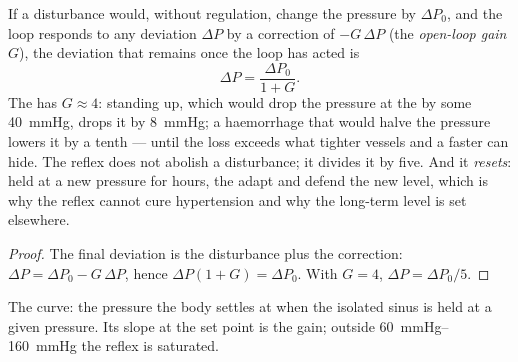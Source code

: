 \begin{theorem}\label{thm:b2:blood-pressure:gain}
If a disturbance would, without regulation, change the pressure by
$\Delta P_0$, and the loop responds to any deviation $\Delta P$ by a
correction of $-G\,\Delta P$ (the \emph{open-loop gain} $G$), the
deviation that remains once the loop has acted is
\[
\Delta P = \frac{\Delta P_0}{1 + G}.
\]
The  has $G \approx 4$: standing up, which would drop the
pressure at the  by some \qty{40}{mmHg}, drops it by
\qty{8}{mmHg}; a haemorrhage that would halve the pressure lowers it
by a tenth --- until the loss exceeds what tighter vessels and a
faster  can hide. The reflex does not abolish a disturbance;
it divides it by five. And it \emph{resets}: held at a new pressure
for hours, the  adapt and defend the new level, which
is why the reflex cannot cure hypertension and why the long-term
level is set elsewhere.
\end{theorem}
\begin{proof}
The final deviation is the disturbance plus the correction:
$\Delta P = \Delta P_0 - G\,\Delta P$, hence $\Delta P(1 + G) =
\Delta P_0$. With $G = 4$, $\Delta P = \Delta P_0/5$.
\end{proof}

\begin{omfigure}

{\small The  curve: the pressure the body settles at when
the isolated sinus is held at a given pressure. Its slope at the set
point is the gain; outside \qtyrange{60}{160}{mmHg} the reflex is
saturated.}
\end{omfigure}

